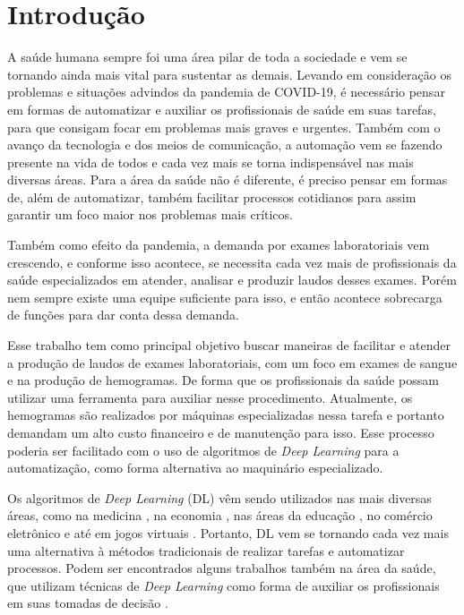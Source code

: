 \chapter{Introdução}
\label{chap:introducao}

A saúde humana sempre foi uma área pilar de toda a sociedade e vem se tornando ainda mais vital para sustentar as demais. Levando em consideração os problemas e situações advindos da pandemia de COVID-19, é necessário pensar em formas de automatizar e auxiliar os profissionais de saúde em suas tarefas, para que consigam focar em problemas mais graves e urgentes. Também com o avanço da tecnologia e dos meios de comunicação, a automação vem se fazendo presente na vida de todos e cada vez mais se torna indispensável nas mais diversas áreas. Para a área da saúde não é diferente, é preciso pensar em formas de, além de automatizar, também facilitar processos cotidianos para assim garantir um foco maior nos problemas mais críticos.

Também como efeito da pandemia, a demanda por exames laboratoriais vem crescendo, e conforme isso acontece, se necessita cada vez mais de profissionais da saúde especializados em atender, analisar e produzir laudos desses exames. Porém nem sempre existe uma equipe suficiente para isso, e então acontece sobrecarga de funções para dar conta dessa demanda.

Esse trabalho tem como principal objetivo buscar maneiras de facilitar e atender a produção de laudos de exames laboratoriais, com um foco em exames de sangue e na produção de hemogramas. De forma que os profissionais da saúde possam utilizar uma ferramenta para auxiliar nesse procedimento. Atualmente, os hemogramas são realizados por máquinas especializadas nessa tarefa e portanto demandam um alto custo financeiro e de manutenção para isso. Esse processo poderia ser facilitado com o uso de algoritmos de \emph{Deep Learning} para a automatização, como forma alternativa ao maquinário especializado.

Os algoritmos de \emph{Deep Learning} (DL) vêm sendo utilizados nas mais diversas áreas, como na medicina \cite{deepLearningMedicine}, na economia \cite{deepLearningEconomy}, nas áreas da educação \cite{deepLearningEducation}, no comércio eletrônico \cite{deepLearningEcommerce} e até em jogos virtuais \cite{deepLearningGaming}. Portanto, DL vem se tornando cada vez mais uma alternativa à métodos tradicionais de realizar tarefas e automatizar processos. Podem ser encontrados alguns trabalhos também na área da saúde, que utilizam técnicas de \emph{Deep Learning} como forma de auxiliar os profissionais em suas tomadas de decisão \cite{deepLearningHealth1} \cite{deepLearningHealth2}.

